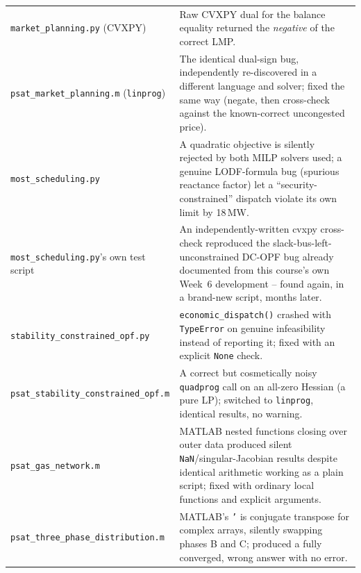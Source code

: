 \documentclass[11pt]{report}
\newcommand{\pkg}[1]{\texttt{#1}}
\theoremstyle{plain}
\theoremstyle{definition}
\theoremstyle{remark}
\begin{document}
\begin{longtable}{@{}p{3.6cm}p{11.9cm}@{}}
\pkg{market\_\hspace{0pt}planning.py} (CVXPY) & Raw CVXPY dual for the balance equality returned the \emph{negative} of the correct LMP. \\
\pkg{psat\_\hspace{0pt}market\_\hspace{0pt}planning.m} (\texttt{linprog}) & The identical dual-sign bug, independently re-discovered in a different language and solver; fixed the same way (negate, then cross-check against the known-correct uncongested price). \\
\pkg{most\_\hspace{0pt}scheduling.py} & A quadratic objective is silently rejected by both MILP solvers used; a genuine LODF-formula bug (spurious reactance factor) let a ``security-constrained'' dispatch violate its own limit by 18\,MW. \\
\pkg{most\_\hspace{0pt}scheduling.py}'s own test script & An independently-written cvxpy cross-check reproduced the slack-bus-left-unconstrained DC-OPF bug already documented from this course's own Week~6 development -- found again, in a brand-new script, months later. \\
\pkg{stability\_\hspace{0pt}constrained\_\hspace{0pt}opf.py} & \texttt{economic\_dispatch()} crashed with \texttt{TypeError} on genuine infeasibility instead of reporting it; fixed with an explicit \texttt{None} check. \\
\pkg{psat\_\hspace{0pt}stability\_\hspace{0pt}constrained\_\hspace{0pt}opf.m} & A correct but cosmetically noisy \texttt{quadprog} call on an all-zero Hessian (a pure LP); switched to \texttt{linprog}, identical results, no warning. \\
\pkg{psat\_\hspace{0pt}gas\_\hspace{0pt}network.m} & MATLAB nested functions closing over outer data produced silent \texttt{NaN}/singular-Jacobian results despite identical arithmetic working as a plain script; fixed with ordinary local functions and explicit arguments. \\
\pkg{psat\_\hspace{0pt}three\_\hspace{0pt}phase\_\hspace{0pt}distribution.m} & MATLAB's \texttt{'} is conjugate transpose for complex arrays, silently swapping phases B and C; produced a fully converged, wrong answer with no error. \\

\end{longtable}
\end{document}
